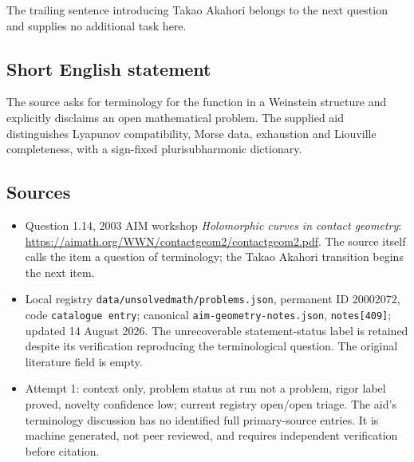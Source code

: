 \documentclass[11pt]{article}
\begin{document}
The trailing sentence introducing Takao Akahori belongs to the next question and supplies no additional task here.
\subsection{Short English statement}
The source asks for terminology for the function in a Weinstein structure and explicitly disclaims an open mathematical problem. The supplied aid distinguishes Lyapunov compatibility, Morse data, exhaustion and Liouville completeness, with a sign-fixed plurisubharmonic dictionary.
\subsection{Sources}
\begin{itemize}
\item Question 1.14, 2003 AIM workshop \emph{Holomorphic curves in contact geometry}: \url{https://aimath.org/WWN/contactgeom2/contactgeom2.pdf}. The source itself calls the item a question of terminology; the Takao Akahori transition begins the next item.
\item Local registry \texttt{data/unsolvedmath/problems.json}, permanent ID 20002072, code \texttt{catalogue entry}; canonical \texttt{aim-geometry-notes.json}, \texttt{notes[409]}; updated 14 August 2026. The unrecoverable statement-status label is retained despite its verification reproducing the terminological question. The original literature field is empty.
\item Attempt 1: context only, problem status at run not a problem, rigor label proved, novelty confidence low; current registry open/open triage. The aid's terminology discussion has no identified full primary-source entries. It is machine generated, not peer reviewed, and requires independent verification before citation.
\end{itemize}
\end{document}
